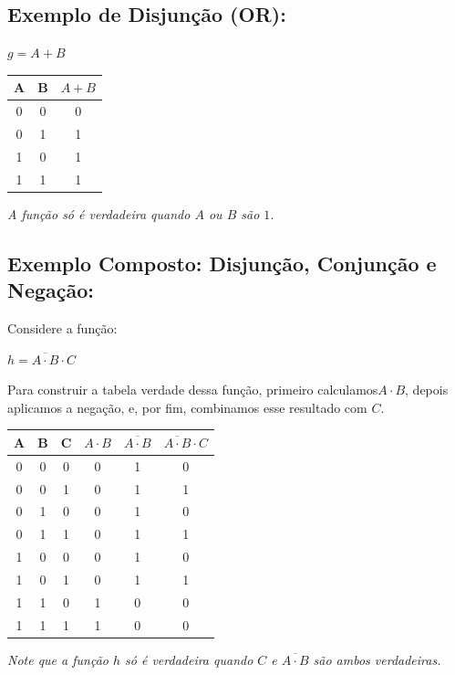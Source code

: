 \documentclass[12pt]{article}
\begin{document}
\subsection*{Exemplo de Disjunção (\textbf{OR}):}
$ g = A + B$
\begin{center}
\begin{tabular}{|c|c|c|}
\hline
A & B & \( A + B \) \\
\hline
0 & 0 & 0 \\
0 & 1 & 1 \\
1 & 0 & 1 \\
1 & 1 & 1 \\ 
\hline
\end{tabular}

\vspace{0.5em}
\textit{A função só é verdadeira quando $A$ ou $B$ são $1$.}
\end{center}

\subsection*{Exemplo Composto: Disjunção, Conjunção e Negação:}
Considere a função:
\begin{center}
$h = \overline{A \cdot B} \cdot C$
\end{center}
Para construir a tabela verdade dessa função, primeiro calculamos\( A \cdot B\), depois aplicamos a negação, e, por fim, combinamos esse resultado com \( C \).

\begin{center}
\begin{minipage}{0.44\textwidth}
\begin{tabular}{|c|c|c|c|c|c|}
\hline
A & B & C & \( A \cdot B \) & \( \overline{A \cdot B} \) & \( \overline{A \cdot B} \cdot C \) \\
\hline
0 & 0 & 0 & 0 & 1 & 0 \\
0 & 0 & 1 & 0 & 1 & 1 \\
0 & 1 & 0 & 0 & 1 & 0 \\
0 & 1 & 1 & 0 & 1 & 1 \\
1 & 0 & 0 & 0 & 1 & 0 \\
1 & 0 & 1 & 0 & 1 & 1 \\
1 & 1 & 0 & 1 & 0 & 0 \\
1 & 1 & 1 & 1 & 0 & 0 \\
\hline
\end{tabular}
\end{minipage}%
\hspace{1em}%
\begin{minipage}{0.2\textwidth}
   \vspace{1em}
   \textit{Note que a função $h$ só é verdadeira quando $C$ e $\overline{A \cdot B}$ são ambos verdadeiras.}
\end{minipage}
\end{center}
\end{document}

